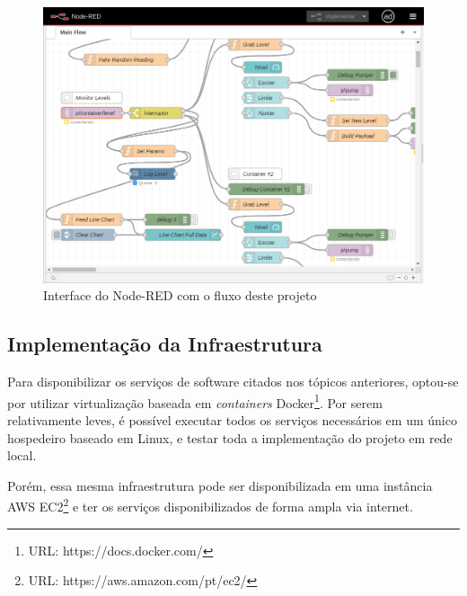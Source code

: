 \begin{figure}[h!]
    \centering
    \includegraphics[width=0.5\linewidth]{imagem/node-red-ui.png}
    \caption{Interface do Node-RED com o fluxo deste projeto}
    \label{fig:node-red-ui}
\end{figure}

\subsection{Implementação da Infraestrutura}
Para disponibilizar os serviços de software citados nos tópicos anteriores, optou-se por utilizar virtualização baseada em \textit{containers} Docker\footnote{URL: https://docs.docker.com/}. Por serem relativamente leves, é possível executar todos os serviços necessários em um único hospedeiro baseado em Linux, e testar toda a implementação do projeto em rede local.

Porém, essa mesma infraestrutura pode ser disponibilizada em uma instância AWS EC2\footnote{URL: https://aws.amazon.com/pt/ec2/} e ter os serviços disponibilizados de forma ampla via internet.

\clearpage

